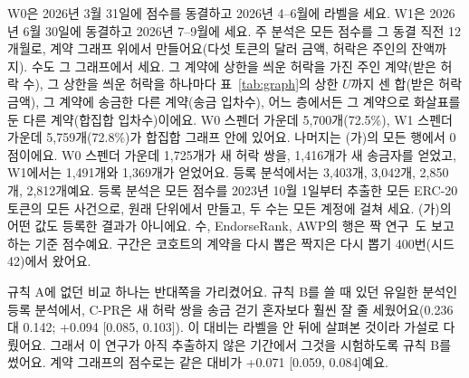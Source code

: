 \begin{table}[!ht]
\vspace{4pt}
\parbox{\linewidth}{\footnotesize W0은 2026년 3월 31일에 점수를 동결하고 2026년 4–6월에 라벨을 세요. W1은 2026년 6월 30일에 동결하고 2026년 7–9월에 세요. 주 분석은 모든 점수를 그 동결 직전 12개월로, 계약 그래프 위에서 만들어요(다섯 토큰의 달러 금액, 허락은 주인의 잔액까지). 수도 그 그래프에서 세요. 그 계약에 상한을 씌운 허락을 가진 주인 계약(받은 허락 수), 그 상한을 씌운 허락을 하나마다 표~\ref{tab:graph}의 상한 $U$까지 센 합(받은 허락 금액), 그 계약에 송금한 다른 계약(송금 입차수), 어느 층에서든 그 계약으로 화살표를 둔 다른 계약(합집합 입차수)이에요. W0 스펜더 가운데 5{,}700개(72.5\%), W1 스펜더 가운데 5{,}759개(72.8\%)가 합집합 그래프 안에 있어요. 나머지는 (가)의 모든 행에서 0점이에요. W0 스펜더 가운데 1{,}725개가 새 허락 쌍을, 1{,}416개가 새 송금자를 얻었고, W1에서는 1{,}491개와 1{,}369개가 얻었어요. 등록 분석에서는 3{,}403개, 3{,}042개, 2{,}850개, 2{,}812개예요. 등록 분석은 모든 점수를 2023년 10월 1일부터 추출한 모든 ERC-20 토큰의 모든 사건으로, 원래 단위에서 만들고, 두 수는 모든 계정에 걸쳐 세요. (가)의 어떤 값도 등록한 결과가 아니에요. 수, EndorseRank, AWP의 행은 짝 연구~\cite{kwon2026companion}도 보고하는 기준 점수예요. 구간은 코호트의 계약을 다시 뽑은 짝지은 다시 뽑기 400번(시드 42)에서 왔어요.}
\end{table}

규칙 A에 없던 비교 하나는 반대쪽을 가리켰어요. 규칙 B를 쓸 때 있던 유일한 분석인 등록 분석에서, C-PR은 새 허락 쌍을 송금 걷기 혼자보다 훨씬 잘 줄 세웠어요(0.236 대 0.142; +0.094 [0.085, 0.103]). 이 대비는 라벨을 안 뒤에 살펴본 것이라 가설로 다뤘어요. 그래서 이 연구가 아직 추출하지 않은 기간에서 그것을 시험하도록 규칙 B를 썼어요. 계약 그래프의 점수로는 같은 대비가 +0.071 [0.059, 0.084]예요.


